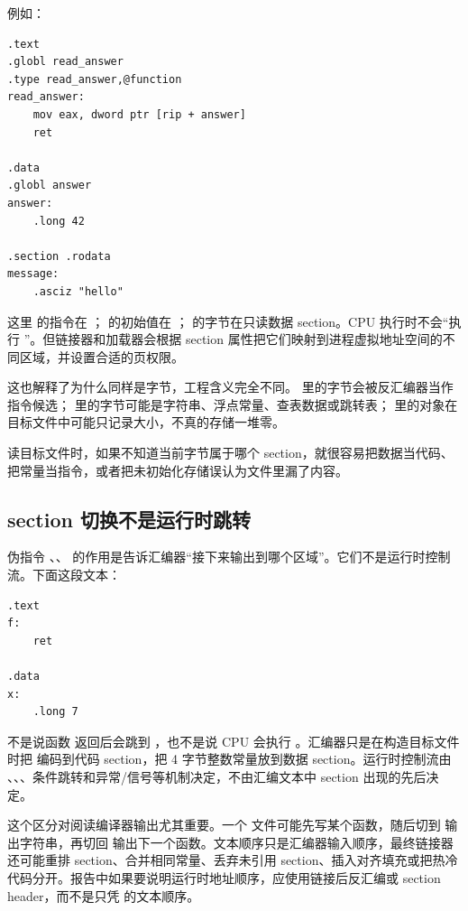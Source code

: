 例如：

\begin{lstlisting}
.text
.globl read_answer
.type read_answer,@function
read_answer:
    mov eax, dword ptr [rip + answer]
    ret

.data
.globl answer
answer:
    .long 42

.section .rodata
message:
    .asciz "hello"
\end{lstlisting}

这里  的指令在 ； 的初始值在 ； 的字节在只读数据 section。CPU 执行时不会“执行 ”。但链接器和加载器会根据 section 属性把它们映射到进程虚拟地址空间的不同区域，并设置合适的页权限。

这也解释了为什么同样是字节，工程含义完全不同。 里的字节会被反汇编器当作指令候选； 里的字节可能是字符串、浮点常量、查表数据或跳转表； 里的对象在目标文件中可能只记录大小，不真的存储一堆零。

读目标文件时，如果不知道当前字节属于哪个 section，就很容易把数据当代码、把常量当指令，或者把未初始化存储误认为文件里漏了内容。

\subsection{section 切换不是运行时跳转}

伪指令 、、 的作用是告诉汇编器“接下来输出到哪个区域”。它们不是运行时控制流。下面这段文本：

\begin{lstlisting}
.text
f:
    ret

.data
x:
    .long 7
\end{lstlisting}

不是说函数  返回后会跳到 ，也不是说 CPU 会执行 。汇编器只是在构造目标文件时把  编码到代码 section，把 4 字节整数常量放到数据 section。运行时控制流由 、、、条件跳转和异常/信号等机制决定，不由汇编文本中 section 出现的先后决定。

这个区分对阅读编译器输出尤其重要。一个  文件可能先写某个函数，随后切到  输出字符串，再切回  输出下一个函数。文本顺序只是汇编器输入顺序，最终链接器还可能重排 section、合并相同常量、丢弃未引用 section、插入对齐填充或把热冷代码分开。报告中如果要说明运行时地址顺序，应使用链接后反汇编或 section header，而不是只凭  的文本顺序。

